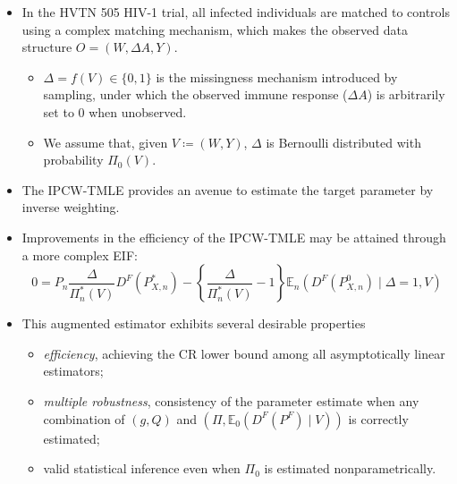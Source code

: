 \documentclass[landscape,a0paper,fontscale=0.285]{baposter} %
\begin{document}
\begin{poster}
{\vspace{-0.35em}
\begin{itemize}
\itemsep0.1pt
\item In the HVTN 505 HIV-1 trial, all infected individuals are matched to
  controls using a complex matching mechanism, which makes the observed data
  structure \textbf{$O = (W, \Delta A, Y)$}.
  \vspace{-0.25em}
  \begin{itemize}
    \itemsep0pt
    \item $\Delta = f(V) \in \{0, 1\}$ is the missingness mechanism introduced
      by sampling, under which the observed immune response ($\Delta A$) is
      arbitrarily set to $0$ when unobserved.
    \item We assume that, given $V \coloneqq (W, Y)$, $\Delta$ is Bernoulli
      distributed with probability $\Pi_0(V)$.
  \end{itemize}
\item The IPCW-TMLE \cite{rose2011targeted2sd} provides an avenue to estimate
  the target parameter by inverse weighting.
\item Improvements in the efficiency of the IPCW-TMLE may be attained through a
  more complex EIF:
  \begin{equation}
    0 = P_n \frac{\Delta}{\Pi_n^*(V)}D^F(P^*_{X,n}) -
      \left\{\frac{\Delta}{\Pi_n^*(V)} - 1 \right\} \mathbb{E}_n(D^F(P^0_{X,n})
      \mid \Delta = 1, V)
  \end{equation}
\item This augmented estimator exhibits several desirable properties
  \vspace{-0.25em}
  \begin{itemize}
    \itemsep0pt
    \item \textit{efficiency}, achieving the CR lower bound among all
      asymptotically linear estimators;
    \item \textit{multiple robustness}, consistency of the parameter estimate
      when any combination of $(g, Q)$ and
      $(\Pi, \mathbb{E}_0(D^F(P^F) \mid V))$ is correctly estimated;
    \item valid statistical inference even when $\Pi_0$ is estimated
      nonparametrically.
  \end{itemize}
\end{itemize}
}


\end{poster}
\end{document}
